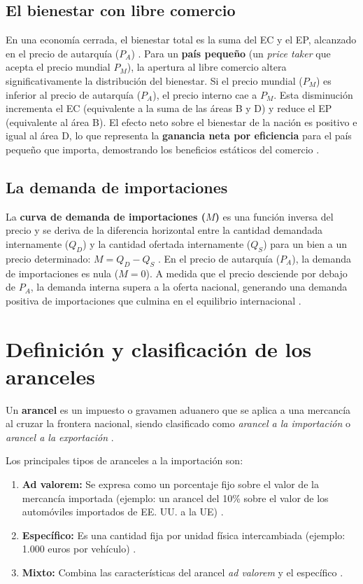 \subsection{El bienestar con libre comercio}
En una economía cerrada, el bienestar total es la suma del EC y el EP, alcanzado en el precio de autarquía ($P_A$) . Para un \textbf{país pequeño} (un \textit{price taker} que acepta el precio mundial $P_M$), la apertura al libre comercio altera significativamente la distribución del bienestar. Si el precio mundial ($P_M$) es inferior al precio de autarquía ($P_A$), el precio interno cae a $P_M$. Esta disminución incrementa el EC (equivalente a la suma de las áreas B y D) y reduce el EP (equivalente al área B). El efecto neto sobre el bienestar de la nación es positivo e igual al área D, lo que representa la \textbf{ganancia neta por eficiencia} para el país pequeño que importa, demostrando los beneficios estáticos del comercio .

\subsection{La demanda de importaciones}
La \textbf{curva de demanda de importaciones ($M$)} es una función inversa del precio y se deriva de la diferencia horizontal entre la cantidad demandada internamente ($Q_D$) y la cantidad ofertada internamente ($Q_S$) para un bien a un precio determinado: $M = Q_D - Q_S$ . En el precio de autarquía ($P_A$), la demanda de importaciones es nula ($M=0$). A medida que el precio desciende por debajo de $P_A$, la demanda interna supera a la oferta nacional, generando una demanda positiva de importaciones que culmina en el equilibrio internacional .

\section{Definición y clasificación de los aranceles}
Un \textbf{arancel} es un impuesto o gravamen aduanero que se aplica a una mercancía al cruzar la frontera nacional, siendo clasificado como \textit{arancel a la importación} o \textit{arancel a la exportación} .

Los principales tipos de aranceles a la importación son:
\begin{enumerate}
    \item \textbf{Ad valorem:} Se expresa como un porcentaje fijo sobre el valor de la mercancía importada (ejemplo: un arancel del 10\% sobre el valor de los automóviles importados de EE. UU. a la UE) .
    \item \textbf{Específico:} Es una cantidad fija por unidad física intercambiada (ejemplo: 1.000 euros por vehículo) .
    \item \textbf{Mixto:} Combina las características del arancel \textit{ad valorem} y el específico .
\end{enumerate}

